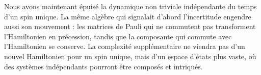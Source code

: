 \begin{classroomqa}\end{classroomqa}

Nous avons maintenant épuisé la dynamique non triviale indépendante du temps d’un spin unique. La même algèbre qui signalait d’abord l’incertitude engendre aussi son mouvement : les matrices de Pauli qui ne commutent pas transforment l’Hamiltonien en précession, tandis que la composante qui commute avec l’Hamiltonien se conserve. La complexité supplémentaire ne viendra pas d’un nouvel Hamiltonien pour un spin unique, mais d’un espace d’états plus vaste, où des systèmes indépendants pourront être composés et intriqués.
